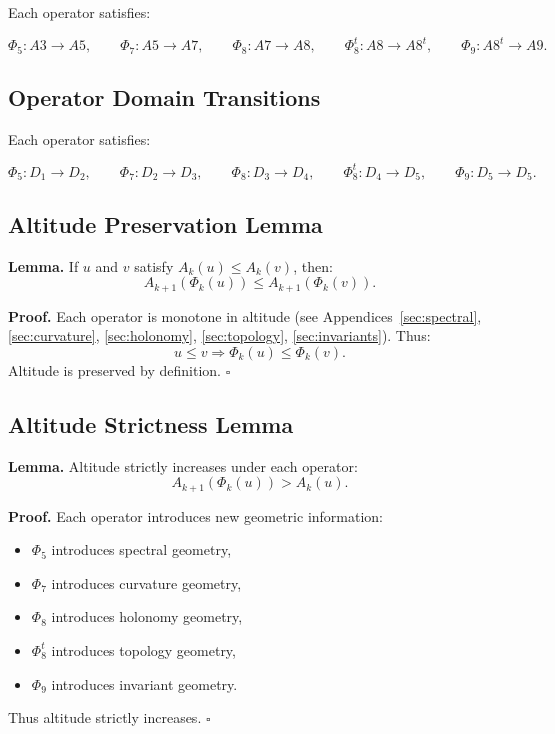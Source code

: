 Each operator satisfies:

\[
\Phi_5 : A3 \to A5,
\qquad
\Phi_7 : A5 \to A7,
\qquad
\Phi_8 : A7 \to A8,
\qquad
\Phi_8^t : A8 \to A8^t,
\qquad
\Phi_9 : A8^t \to A9.
\]

\subsection{Operator Domain Transitions}

Each operator satisfies:

\[
\Phi_5 : D_1 \to D_2,
\qquad
\Phi_7 : D_2 \to D_3,
\qquad
\Phi_8 : D_3 \to D_4,
\qquad
\Phi_8^t : D_4 \to D_5,
\qquad
\Phi_9 : D_5 \to D_5.
\]

\subsection{Altitude Preservation Lemma}

\textbf{Lemma.}
If $u$ and $v$ satisfy $A_k(u) \le A_k(v)$, then:
\[
A_{k+1}(\Phi_k(u)) \le A_{k+1}(\Phi_k(v)).
\]

\textbf{Proof.}
Each operator is monotone in altitude (see Appendices~\ref{sec:spectral},
\ref{sec:curvature}, \ref{sec:holonomy}, \ref{sec:topology},
\ref{sec:invariants}). Thus:
\[
u \le v \Rightarrow \Phi_k(u) \le \Phi_k(v).
\]
Altitude is preserved by definition. \(\square\)

\subsection{Altitude Strictness Lemma}

\textbf{Lemma.}
Altitude strictly increases under each operator:
\[
A_{k+1}(\Phi_k(u)) > A_k(u).
\]

\textbf{Proof.}
Each operator introduces new geometric information:

\begin{itemize}
    \item $\Phi_5$ introduces spectral geometry,
    \item $\Phi_7$ introduces curvature geometry,
    \item $\Phi_8$ introduces holonomy geometry,
    \item $\Phi_8^t$ introduces topology geometry,
    \item $\Phi_9$ introduces invariant geometry.
\end{itemize}

Thus altitude strictly increases. \(\square\)

